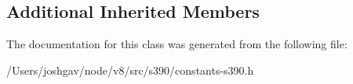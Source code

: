 \subsection*{Additional Inherited Members}


The documentation for this class was generated from the following file\+:\begin{DoxyCompactItemize}
\item 
/\+Users/joshgav/node/v8/src/s390/constants-\/s390.\+h\end{DoxyCompactItemize}
